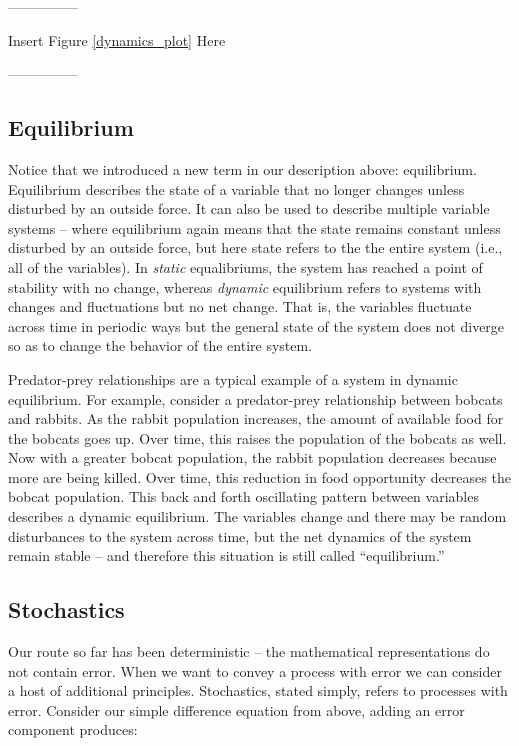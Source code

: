 \documentclass[english,,man]{apa6}
\theoremstyle{definition}
\theoremstyle{definition}
\theoremstyle{definition}
\theoremstyle{remark}
\begin{document}
\begin{center}

---------------

Insert Figure \ref{dynamics_plot} Here

---------------

\end{center}

\hypertarget{equilibrium}{%
\subsection{Equilibrium}\label{equilibrium}}

Notice that we introduced a new term in our description above:
equilibrium. Equilibrium describes the state of a variable that no
longer changes unless disturbed by an outside force. It can also be used
to describe multiple variable systems -- where equilibrium again means
that the state remains constant unless disturbed by an outside force,
but here state refers to the the entire system (i.e., all of the
variables). In \emph{static} equalibriums, the system has reached a
point of stability with no change, whereas \emph{dynamic} equilibrium
refers to systems with changes and fluctuations but no net change. That
is, the variables fluctuate across time in periodic ways but the general
state of the system does not diverge so as to change the behavior of the
entire system.

Predator-prey relationships are a typical example of a system in dynamic
equilibrium. For example, consider a predator-prey relationship between
bobcats and rabbits. As the rabbit population increases, the amount of
available food for the bobcats goes up. Over time, this raises the
population of the bobcats as well. Now with a greater bobcat population,
the rabbit population decreases because more are being killed. Over
time, this reduction in food opportunity decreases the bobcat
population. This back and forth oscillating pattern between variables
describes a dynamic equilibrium. The variables change and there may be
random disturbances to the system across time, but the net dynamics of
the system remain stable -- and therefore this situation is still called
\enquote{equilibrium.}

\hypertarget{stochastics}{%
\subsection{Stochastics}\label{stochastics}}

Our route so far has been deterministic -- the mathematical
representations do not contain error. When we want to convey a process
with error we can consider a host of additional principles. Stochastics,
stated simply, refers to processes with error. Consider our simple
difference equation from above, adding an error component produces:
\end{document}
